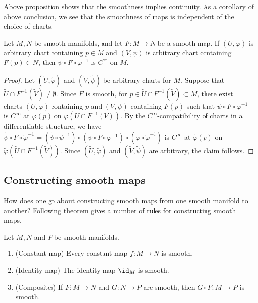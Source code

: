 Above proposition shows that the smoothness implies continuity. As a corollary of above conclusion, we see that the smoothness of maps is independent of the choice of charts.

\begin{corollary}\label{lem:smoothness is independent of chars}
    Let $M, N$ be smooth manifolds, and let $F : M \to N$ be a smooth map. If $(U, \varphi)$ is arbitrary chart containing $p \in M$ and $(V, \psi)$ is arbitrary chart containing $F(p) \in N$, then $\psi\circ F \circ \varphi^{-1}$ is $C^\infty$ on $M$.
\end{corollary}

\begin{proof}
    Let $(\widetilde{U}, \widetilde{\varphi})$ and $(\widetilde{V}, \widetilde{\psi})$ be arbitrary charts for $M$. Suppose that $\widetilde{U} \cap F^{-1}(\widetilde{V}) \neq \emptyset$. Since $F$ is smooth, for $p \in \widetilde{U} \cap F^{-1}(\widetilde{V}) \subset M$, there exist charts $(U, \varphi)$ containing $p$ and $(V, \psi)$ containing $F(p)$ such that $\psi \circ F \circ \varphi^{-1}$ is $C^\infty$ at $\varphi(p)$ on $\varphi(U \cap F^{-1}(V))$. By the $C^\infty$-compatibility of charts in a differentiable structure, we have $\widetilde{\psi} \circ F \circ \widetilde{\varphi}^{-1} = (\widetilde{\psi} \circ \psi^{-1}) \circ (\psi \circ F \circ \varphi^{-1}) \circ (\varphi \circ \widetilde{\varphi}^{-1})$ is $C^\infty$ at $\widetilde{\varphi}(p)$ on $\widetilde{\varphi}(\widetilde{U} \cap F^{-1}(\widetilde{V}))$. Since $(\widetilde{U}, \widetilde{\varphi})$ and $(\widetilde{V}, \widetilde{\psi})$ are arbitrary, the claim follows.
\end{proof}

\subsection{Constructing smooth maps}

How does one go about constructing smooth maps from one smooth manifold to another? Following theorem gives a number of rules for constructing smooth maps.

\begin{theorem}\label{lem:construction of smooth maps}
    Let $M, N$ and $P$ be smooth manifolds.
    \begin{enumerate}
        \item (Constant map) Every constant map $f : M \to N$ is smooth.
        \item (Identity map) The identity map $\id_M$ is smooth.
        \item (Composites) If $F : M \to N$ and $G : N \to P$ are smooth, then $G \circ F : M \to P$ is smooth.
    \end{enumerate}
\end{theorem}

